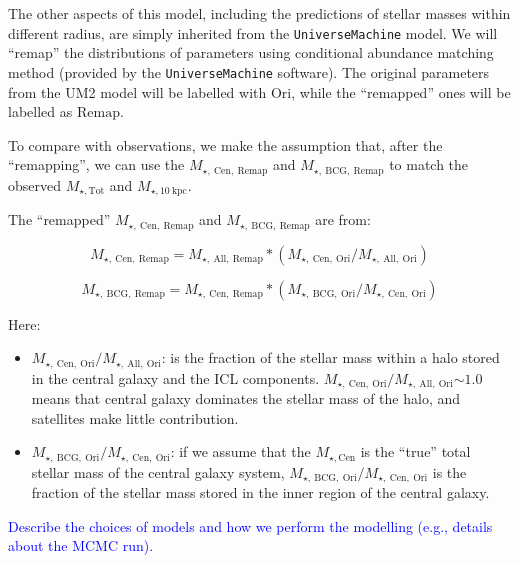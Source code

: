 \documentclass[a4paper,fleqn,usenatbib]{mnras}
\def\mtot{{$M_{\star,\mathrm{Tot}}$}}
\def\minn{{$M_{\star,10\ \mathrm{kpc}}$}}
\def\mcen{{$M_{\star,\mathrm{Cen}}$}}
\def\fraccen{{$M_{\star,\ \mathrm{Cen,\ Ori}} / M_{\star,\ \mathrm{All,\ Ori}}$}}
\def\fracbcg{{$M_{\star,\ \mathrm{BCG,\ Ori}} / M_{\star,\ \mathrm{Cen,\ Ori}}$}}
\def\um{\texttt{UniverseMachine}}
\newcommand{\plan}[1]{\textcolor{blue}{#1}}
\begin{document}
    The other aspects of this model, including the predictions of stellar masses 
    within different radius, are simply inherited from the \um{} model. 
    We will ``remap'' the distributions of parameters using conditional abundance 
    matching method (provided by the \um{} software).  
    The original parameters from the UM2 model will be labelled with $\mathrm{Ori}$, 
    while the ``remapped'' ones will be labelled as $\mathrm{Remap}$.  

    To compare with observations, we make the assumption that, after the ``remapping'', 
    we can use the $M_{\star,\ \mathrm{Cen,\ Remap}}$ and 
    $M_{\star,\ \mathrm{BCG,\ Remap}}$ to match the observed \mtot{} and \minn{}.

    The ``remapped'' $M_{\star,\ \mathrm{Cen,\ Remap}}$ and 
    $M_{\star,\ \mathrm{BCG,\ Remap}}$ are from: 

    \begin{equation}
        M_{\star,\ \mathrm{Cen,\ Remap}} = M_{\star,\ \mathrm{All,\ Remap}} * 
            (M_{\star,\ \mathrm{Cen,\ Ori}} / M_{\star,\ \mathrm{All,\ Ori}})
    \end{equation}

    \begin{equation}
        M_{\star,\ \mathrm{BCG,\ Remap}} = M_{\star,\ \mathrm{Cen,\ Remap}} * 
            (M_{\star,\ \mathrm{BCG,\ Ori}} / M_{\star,\     \mathrm{Cen,\ Ori}})
    \end{equation}

    Here: 

    \begin{itemize}

        \item \fraccen{}: is the fraction of the stellar mass within a halo stored in 
            the central galaxy and the ICL components. 
            \fraccen{}$\sim 1.0$ means that central galaxy dominates the stellar mass 
            of the halo, and satellites make little contribution.
                
        \item \fracbcg{}: if we assume that the \mcen{} is the ``true'' total stellar 
            mass of the central galaxy system, \fracbcg{} is the fraction of the 
            stellar mass stored in the inner region of the central galaxy.
    
    \end{itemize}
    
    
    \plan{Describe the choices of models and how we perform the modelling (e.g., 
        details about the MCMC run).}
\end{document}
